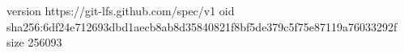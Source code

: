 version https://git-lfs.github.com/spec/v1
oid sha256:6df24e712693dbd1aecb8ab8d35840821f8bf5de379c5f75e87119a76033292f
size 256093
